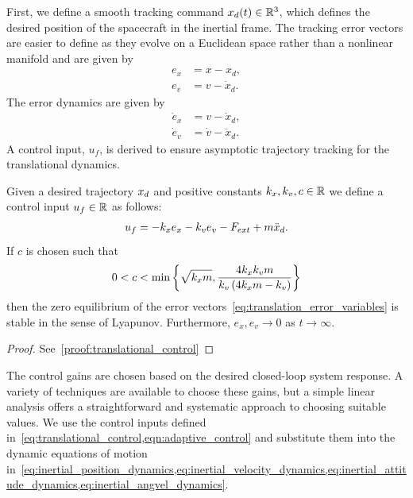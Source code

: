 First, we define a smooth tracking command \( x_d(t) \in \mathbb{R}^3 \), which defines the desired position of the spacecraft in the inertial frame.
The tracking error vectors are easier to define as they evolve on a Euclidean space rather than a nonlinear manifold and are given by
\begin{subequations}\label{eq:translation_error_variables}
\begin{align}
    e_x &= x - x_d ,\\
    e_v &= v - \dot{x}_d.
\end{align}
\end{subequations}
The error dynamics are given by
\begin{subequations}\label{eq:translation_error_dynamics}
\begin{align}
    \dot{e}_x &= v - \dot{x}_d, \\
    \dot{e}_v &= \dot{v} - \ddot{x}_d .
\end{align}
\end{subequations}
A control input, \( u_f \), is derived to ensure asymptotic trajectory tracking for the translational dynamics.
\begin{prop}\label{prop:translational_control}
    Given a desired trajectory \( x_d \) and positive constants \( k_x, k_v, c \in \mathbb{R} \) we define a control input \( u_f \in \mathbb{R} \) as follows:
    \begin{align}\label{eq:translational_control}
        u_f = -k_x e_x - k_v e_v - F_{ext} + m \ddot{x}_d .
    \end{align}
    If \( c \) is chosen such that
    \begin{align}\label{eq:translational_control_gain_bound}
        0 < c < \min \left\{ \sqrt{k_x m}, \frac{4 k_x k_v m}{ k_v \left( 4 k_x m - k_v \right) }    \right\}
    \end{align}
    then the zero equilibrium of the error vectors~\cref{eq:translation_error_variables} is stable in the sense of Lyapunov.
    Furthermore, \( e_x, e_v \to 0 \) as \( t \to \infty\).
\end{prop}
\begin{proof}
    See~\cref{proof:translational_control}
\end{proof}

The control gains are chosen based on the desired closed-loop system response. 
A variety of techniques are available to choose these gains, but a simple linear analysis offers a straightforward and systematic approach to choosing suitable values. 
We use the control inputs defined in~\cref{eq:translational_control,eqn:adaptive_control} and substitute them into the dynamic equations of motion in~\cref{eq:inertial_position_dynamics,eq:inertial_velocity_dynamics,eq:inertial_attitude_dynamics,eq:inertial_angvel_dynamics}.


